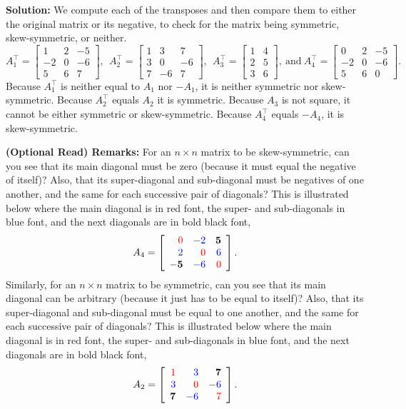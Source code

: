\noindent \textbf{Solution:}
We compute each of the transposes and then compare them to either the original matrix or its negative, to check for the matrix being symmetric, skew-symmetric, or neither.
$$
A_1^\top=\left[
\begin{array}{rrr}
1 & 2 & -5\\
-2 & 0 & -6\\
5 & 6 & 7
\end{array} \right],~~A_2^\top=\left[
\begin{array}{rrr}
1 & 3 & 7\\
3 & 0 & -6\\
7 & -6 & 7
\end{array} \right],~~
A_3^\top=\left[
\begin{array}{cc}
1 & 4 \\
2 & 5 \\
3 & 6
\end{array} \right], ~\text{and}~A_4^\top=\left[
\begin{array}{rrr}
0& 2 & -5\\
-2 & 0 & -6\\
5 & 6 & 0
\end{array} \right].
$$
Because $A_1^\top$ is neither equal to $A_1$ nor $-A_1$, it is neither symmetric nor skew-symmetric. Because $A_2^\top$ equals $A_2$ it is symmetric. Because $A_3$ is not square, it cannot be either symmetric or skew-symmetric. Because $A_4^\top$ equals $-A_4$, it is skew-symmetric.
\Qed

\vspace*{.2cm}

\noindent \textbf{(Optional Read) Remarks:} For an $ n \times n$ matrix to be skew-symmetric, can you see that its main diagonal must be zero (because it must equal the negative of itself)? Also, that its super-diagonal and sub-diagonal must be negatives of one another, and the same for each successive pair of diagonals? This is illustrated below where the main diagonal is in red font, the super- and sub-diagonals in blue font, and the next diagonals are in bold black font,
$$ A_4=\left[
\begin{array}{rrr}
\color{red} 0& \color{blue}-2 & \mathbf{5}\\
\color{blue} 2 & \color{red} 0 & \color{blue}6\\
\mathbf{-5} &\color{blue} -6 & \color{red} 0
\end{array} \right].$$
Similarly,  for an $ n \times n$ matrix to be symmetric, can you see that its main diagonal can be arbitrary (because it just has to be equal to itself)? Also, that its super-diagonal and sub-diagonal must be equal to one another, and the same for each successive pair of diagonals? This is illustrated below where the main diagonal is in red font, the super- and sub-diagonals in blue font, and the next diagonals are in bold black font,
\begin{equation}
\label{eq:DiagonalTestSymmetricMatrix}
    A_2=\left[
\begin{array}{rrr}
\color{red} 1 & \color{blue} 3 & \mathbf{7}\\
\color{blue} 3 & \color{red} 0 & \color{blue} -6\\
\mathbf{7} & \color{blue} -6 & \color{red} 7
\end{array} \right].
\end{equation} 

